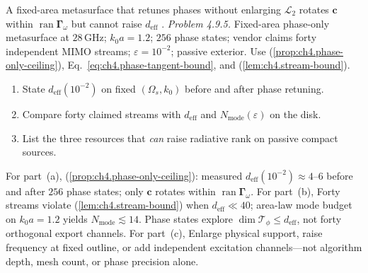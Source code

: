 A fixed-area metasurface that retunes phases without enlarging $\mathcal{L}_{2}$ rotates $\mathbf{c}$ within
$\operatorname{ran}\boldsymbol{\Gamma}_\omega$ but cannot raise $d_{\mathrm{eff}}$ \cite{harrington2001}.
\emph{Problem 4.9.5.} Fixed-area phase-only metasurface at $28\,\mathrm{GHz}$; $k_{0}a=1.2$; $256$ phase states; vendor claims forty independent MIMO streams; $\varepsilon=10^{-2}$; passive exterior. Use (\ref{prop:ch4.phase-only-ceiling}), Eq.~\eqref{eq:ch4.phase-tangent-bound}, and (\ref{lem:ch4.stream-bound}).
\begin{enumerate}
\item[(a)] State $d_{\mathrm{eff}}(10^{-2})$ on fixed $(\Omega_{s},k_{0})$ before and after phase retuning.
\item[(b)] Compare forty claimed streams with $d_{\mathrm{eff}}$ and $N_{\mathrm{mode}}(\varepsilon)$ on the disk.
\item[(c)] List the three resources that \emph{can} raise radiative rank on passive compact sources.
\end{enumerate}
For part~(a), (\ref{prop:ch4.phase-only-ceiling}): measured $d_{\mathrm{eff}}(10^{-2})\approx4$--$6$ before and after $256$ phase states; only $\mathbf{c}$ rotates within $\operatorname{ran}\boldsymbol{\Gamma}_\omega$.
For part~(b), Forty streams violate (\ref{lem:ch4.stream-bound}) when $d_{\mathrm{eff}}\ll40$; area-law mode budget on $k_{0}a=1.2$ yields $N_{\mathrm{mode}}\lesssim14$. Phase states explore $\dim\mathcal{T}_{\phi}\le d_{\mathrm{eff}}$, not forty orthogonal export channels.
For part~(c), Enlarge physical support, raise frequency at fixed outline, or add independent excitation channels---not algorithm depth, mesh count, or phase precision alone.
